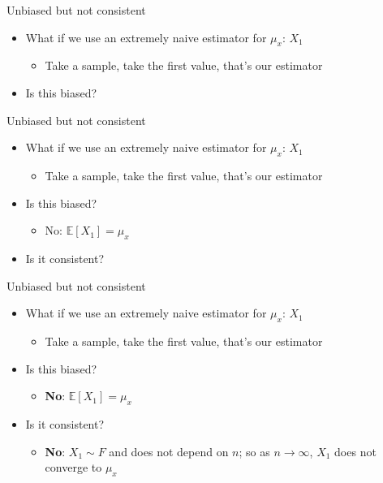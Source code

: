 \documentclass[aspectratio=169]{beamer}
\begin{document}
\begin{frame}{Unbiased but not consistent}
    \begin{itemize}
        \item What if we use an extremely naive estimator for $\mu_x$: $X_1$
        \begin{itemize}
            \item Take a sample, take the first value, that's our estimator
        \end{itemize}
        \item Is this biased?
    \end{itemize}
\end{frame}

\begin{frame}{Unbiased but not consistent}
    \begin{itemize}
        \item What if we use an extremely naive estimator for $\mu_x$: $X_1$
        \begin{itemize}
            \item Take a sample, take the first value, that's our estimator
        \end{itemize}
        \item Is this biased?
        \begin{itemize}
            \item No: $\mathbb{E} [ X_1] = \mu_x $
        \end{itemize}
        \item Is it consistent?
    \end{itemize}
\end{frame}

\begin{frame}{Unbiased but not consistent}
    \begin{itemize}
        \item What if we use an extremely naive estimator for $\mu_x$: $X_1$
        \begin{itemize}
            \item Take a sample, take the first value, that's our estimator
        \end{itemize}
        \item Is this biased?
        \begin{itemize}
            \item \textbf{No}: $\mathbb{E} [ X_1] = \mu_x $
        \end{itemize}
        \item Is it consistent?
        \begin{itemize}
            \item \textbf{No}: $X_1 \sim F$ and does not depend on $n$; so as $n \to \infty$, $X_1$ does not converge to $\mu_x$
        \end{itemize}
    \end{itemize}
\end{frame}
\end{document}
